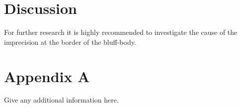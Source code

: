 \documentclass{CFD2017}
\begin{document}
\section{Discussion}
For further research it is highly recommended to investigate the cause of the imprecision at the border of the bluff-body. 




\newpage
\section{Appendix A}
Give any additional information here.
\end{document}
